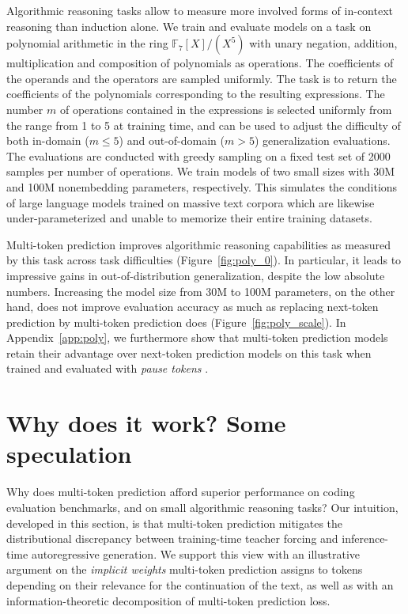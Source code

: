 \documentclass{article}
\theoremstyle{plain}
\theoremstyle{definition}
\theoremstyle{remark}
\begin{document}
Algorithmic reasoning tasks allow to measure more involved forms of in-context reasoning than induction alone. We train and evaluate models on a task on polynomial arithmetic in the ring $\mathbb{F}_7[X]/(X^5)$ with unary negation, addition, multiplication and composition of polynomials as operations. The coefficients of the operands and the operators are sampled uniformly. 
The task is to return the coefficients of the polynomials corresponding to the resulting expressions. The number $m$ of operations contained in the expressions is selected uniformly from the range from 1 to 5 at training time, and can be used to adjust the difficulty of both in-domain ($m \leq 5$) and out-of-domain ($m > 5$) generalization evaluations. The evaluations are conducted with greedy sampling on a fixed test set of 2000 samples per number of operations. We train models of two small sizes with 30M and 100M nonembedding parameters, respectively. This simulates the conditions of large language models trained on massive text corpora which are likewise under-parameterized and unable to memorize their entire training datasets.

Multi-token prediction improves algorithmic reasoning capabilities as measured by this task across task difficulties (Figure~\ref{fig:poly_0}). In particular, it leads to impressive gains in out-of-distribution generalization, despite the low absolute numbers. Increasing the model size from 30M to 100M parameters, on the other hand, does not improve evaluation accuracy as much as replacing next-token prediction by multi-token prediction does (Figure~\ref{fig:poly_scale}). In Appendix~\ref{app:poly}, we furthermore show that multi-token prediction models retain their advantage over next-token prediction models on this task when trained and evaluated with \emph{pause tokens} \citep{goyal2023think}.

\section{Why does it work? Some speculation}

\label{sec:discussion}

Why does multi-token prediction afford superior performance on coding evaluation benchmarks, and on small algorithmic reasoning tasks?
Our intuition, developed in this section, is that multi-token prediction mitigates the distributional discrepancy between training-time teacher forcing and inference-time autoregressive generation.
We support this view with an illustrative argument on the \emph{implicit weights} multi-token prediction assigns to tokens depending on their relevance for the continuation of the text, as well as with an information-theoretic decomposition of multi-token prediction loss.
\end{document}
